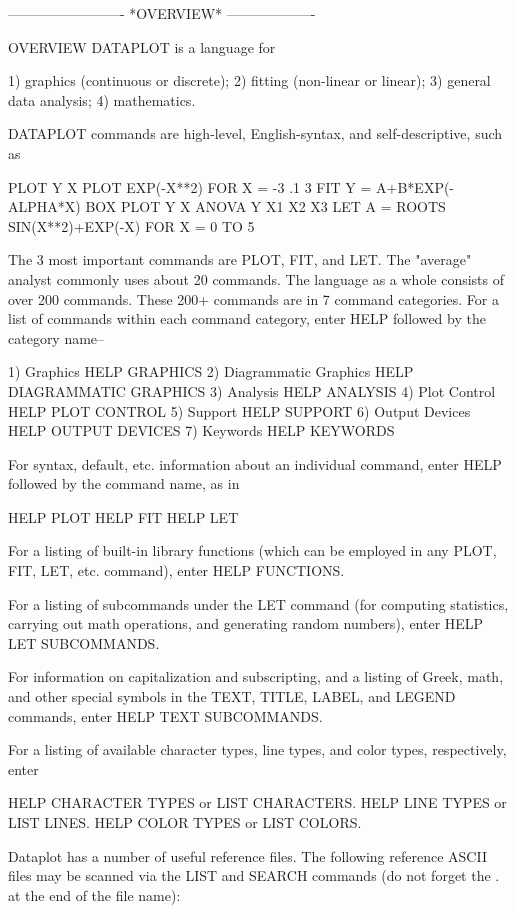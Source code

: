 -------------------------  *OVERVIEW*  -------------------

OVERVIEW
DATAPLOT is a language for
 
   1) graphics (continuous or discrete);
   2) fitting (non-linear or linear);
   3) general data analysis;
   4) mathematics.
 
DATAPLOT commands are high-level, English-syntax, and
self-descriptive, such as
 
   PLOT Y X
   PLOT EXP(-X**2) FOR X = -3 .1 3
   FIT Y = A+B*EXP(-ALPHA*X)
   BOX PLOT Y X
   ANOVA Y X1 X2 X3
   LET A = ROOTS SIN(X**2)+EXP(-X) FOR X = 0 TO 5
 
The 3 most important commands are PLOT, FIT, and LET.
The "average" analyst commonly uses about 20 commands.
The language as a whole consists of over 200 commands.
These 200+ commands are in 7 command categories.  For a
list of commands within each command category, enter
HELP followed by the category name--
 
   1) Graphics               HELP GRAPHICS
   2) Diagrammatic Graphics  HELP DIAGRAMMATIC GRAPHICS
   3) Analysis               HELP ANALYSIS
   4) Plot Control           HELP PLOT CONTROL
   5) Support                HELP SUPPORT
   6) Output Devices         HELP OUTPUT DEVICES
   7) Keywords               HELP KEYWORDS
 
For syntax, default, etc.  information about an
individual command, enter HELP followed by the command
name, as in
 
   HELP PLOT
   HELP FIT
   HELP LET
 
For a listing of built-in library functions (which can
be employed in any PLOT, FIT, LET, etc.  command),
enter HELP FUNCTIONS.
 
For a listing of subcommands under the LET command (for
computing statistics, carrying out math operations, and
generating random numbers), enter HELP LET SUBCOMMANDS.
 
For information on capitalization and subscripting, and
a listing of Greek, math, and other special symbols in
the TEXT, TITLE, LABEL, and LEGEND commands, enter HELP
TEXT SUBCOMMANDS.
 
For a listing of available character types, line types,
and color types, respectively, enter
 
   HELP CHARACTER TYPES     or      LIST CHARACTERS.
   HELP LINE TYPES          or      LIST LINES.
   HELP COLOR TYPES         or      LIST COLORS.
 
Dataplot has a number of useful reference files.  The
following reference ASCII files may be scanned via the
LIST and SEARCH commands (do not forget the . at the
end of the file name):
 

